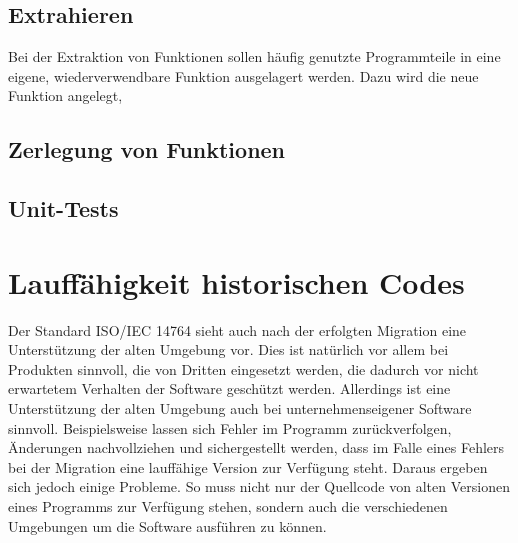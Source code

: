     \subsection{Extrahieren}
        Bei der Extraktion von Funktionen sollen häufig genutzte Programmteile in eine eigene, wiederverwendbare Funktion ausgelagert werden. Dazu wird die neue Funktion
        angelegt, 
    \subsection{Zerlegung von Funktionen}
    \subsection{Unit-Tests}

\section{Lauffähigkeit historischen Codes}\label{VCS}
    Der Standard ISO/IEC 14764 sieht auch nach der erfolgten Migration eine Unterstützung der alten Umgebung vor. Dies ist natürlich vor allem bei Produkten sinnvoll, 
    die von Dritten eingesetzt werden, die dadurch vor nicht erwartetem Verhalten der Software geschützt werden. Allerdings ist eine Unterstützung der alten Umgebung 
    auch bei unternehmenseigener Software sinnvoll. Beispielsweise lassen sich Fehler im Programm zurückverfolgen, Änderungen nachvollziehen und sichergestellt werden,
    dass im Falle eines Fehlers bei der Migration eine lauffähige Version zur Verfügung steht. Daraus ergeben sich jedoch einige Probleme. So muss nicht nur der Quellcode 
    von alten Versionen eines Programms zur Verfügung stehen, sondern auch die verschiedenen Umgebungen um die Software ausführen zu können.
